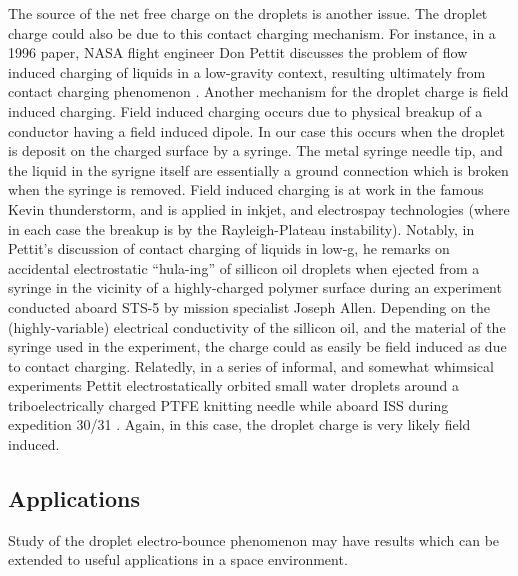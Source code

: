 \documentclass[10pt,a4paper]{article}
\begin{document}
The source of the net free charge on the droplets is another issue. The droplet charge could also be due to this contact charging mechanism. For instance, in a 1996 paper, NASA flight engineer Don Pettit discusses the problem of flow induced charging of liquids in a low-gravity context, resulting ultimately from contact charging phenomenon \cite{pettit_donald_flow_????}. Another mechanism for the droplet charge is field induced charging. Field induced charging occurs due to physical breakup of a conductor having a field induced dipole. In our case this occurs when the droplet is deposit on the charged surface by a syringe. The metal syringe needle tip, and the liquid in the syrigne itself are essentially a ground connection which is broken when the syringe is removed. Field induced charging is at work in the famous Kevin thunderstorm, and is applied in inkjet, and electrospay technologies (where in each case the breakup is by the Rayleigh-Plateau instability). Notably, in Pettit's discussion of contact charging of liquids in low-g, he remarks on accidental electrostatic ``hula-ing'' of sillicon oil droplets when ejected from a syringe in the vicinity of a highly-charged polymer surface during an experiment conducted aboard STS-5 by mission specialist Joseph Allen. Depending on the (highly-variable) electrical conductivity of the sillicon oil, and the material of the syringe used in the experiment, the charge could as easily be field induced as due to contact charging. Relatedly, in a series of informal, and somewhat whimsical experiments Pettit electrostatically orbited small water droplets around a triboelectrically charged PTFE knitting needle while aboard ISS during expedition 30/31 \cite{stevenson_electrostatic_2015}. Again, in this case, the droplet charge is very likely field induced.  

\subsection{Applications}
Study of the droplet electro-bounce phenomenon may have results which can be extended to useful applications in a space environment.
\end{document}
